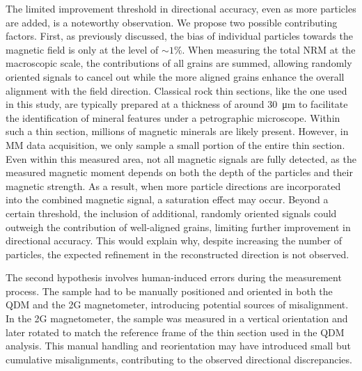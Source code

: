 The limited improvement threshold in directional accuracy, even as more particles are added, is a noteworthy observation. We propose two possible contributing factors. First, as previously discussed, the bias of individual particles towards the magnetic field is only at the level of $\sim1\%$. When measuring the total NRM at the macroscopic scale, the contributions of all grains are summed, allowing randomly oriented signals to cancel out while the more aligned grains enhance the overall alignment with the field direction. Classical rock thin sections, like the one used in this study, are typically prepared at a thickness of around \qty{30}{\um} to facilitate the identification of mineral features under a petrographic microscope. Within such a thin section, millions of magnetic minerals are likely present. However, in MM data acquisition, we only sample a small portion of the entire thin section. Even within this measured area, not all magnetic signals are fully detected, as the measured magnetic moment depends on both the depth of the particles and their magnetic strength. As a result, when more particle directions are incorporated into the combined magnetic signal, a saturation effect may occur. Beyond a certain threshold, the inclusion of additional, randomly oriented signals could outweigh the contribution of well-aligned grains, limiting further improvement in directional accuracy. This would explain why, despite increasing the number of particles, the expected refinement in the reconstructed direction is not observed.

The second hypothesis involves human-induced errors during the measurement process. The sample had to be manually positioned and oriented in both the QDM and the 2G magnetometer, introducing potential sources of misalignment. In the 2G magnetometer, the sample was measured in a vertical orientation and later rotated to match the reference frame of the thin section used in the QDM analysis. This manual handling and reorientation may have introduced small but cumulative misalignments, contributing to the observed directional discrepancies.

